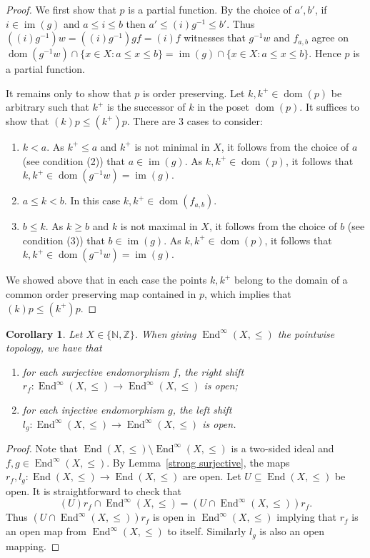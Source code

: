 \documentclass[11pt]{amsart}
\newtheorem{corollary}[theorem]{Corollary}
\theoremstyle{definition}
\newcommand{\N}{\mathbb N}
\newcommand{\Z}{\mathbb Z}
\newcommand{\im}{\operatorname{im}}
\newcommand{\dom}{\operatorname{dom}}
\begin{document}
\begin{proof}
We first show that \(p\) is a partial function. By the choice of \(a',b'\), if \(i\in \im(g)\) and \(a\leq i\leq b\) then \(a'\leq (i)g^{-1}\leq b'\). 
Thus \(((i)g^{-1})w=((i)g^{-1})gf=(i)f\) witnesses that \(g^{-1}w\) and \(f_{a,b}\) agree 
on $\dom(g^{-1}w)\cap \{x\in X: a\leq x\leq b\}=\im(g)\cap \{x\in X: a\leq x\leq b\}$.
Hence \(p\) is a partial function.

It remains only to show that \(p\) is order preserving. Let \(k,k^+\in \dom(p)\) be arbitrary such that \(k^+\) is the successor of \(k \) in the poset \(\dom(p)\). It suffices to show that \((k)p\leq (k^+)p\). There are 3 cases to consider:
\begin{enumerate}[\rm(a)]
    \item \(k<a\). As \(k^+\leq a\) and \(k^+\) is not minimal in \(X\), it follows from the choice of \(a\) (see condition (2)) that \(a\in \im(g)\).
    As \(k,k^+\in \dom(p)\), it follows that \(k,k^+\in \dom(g^{-1}w)=\im(g)\).
    \item \(a\leq k<b\). In this case \(k,k^+\in \dom(f_{a,b})\).
    \item \(b\leq k\). As \(k\geq b\) and \(k\) is not maximal in \(X\), it follows from the choice of \(b\) (see condition (3)) that \(b\in \im(g)\).
    As \(k,k^+\in \dom(p)\), it follows that \(k,k^+\in \dom(g^{-1}w)=\im(g)\).
\end{enumerate}

We showed above that in each case the points \(k,k^+\) belong to the domain of a common order preserving map contained in \(p\), which implies that \((k)p\leq (k^+)p\).
\end{proof}




\begin{corollary}\label{open D1}
Let \(X\in \{\N,\Z\}\). When giving $\operatorname{End}^\infty(X,\leq)$ the pointwise topology, we have that 
\begin{enumerate}
    \item for each surjective endomorphism $f$, the right shift $r_f: \operatorname{End}^\infty(X,\leq)\rightarrow \operatorname{End}^\infty(X,\leq)$ is open;
    \item for each injective endomorphism $g$, the left shift $l_g: \operatorname{End}^\infty(X,\leq)\rightarrow \operatorname{End}^\infty(X,\leq)$ is open.
\end{enumerate}
\end{corollary}
\begin{proof}
Note that $\operatorname{End}(X,\leq)\setminus \operatorname{End}^\infty(X,\leq)$ is a two-sided ideal and \(f,g\in \operatorname{End}^{\infty}(X,\leq)\).
By Lemma~\ref{strong surjective}, the maps \(r_f,l_g:\operatorname{End}(X,\leq)\to \operatorname{End}(X,\leq)\) are open. Let \(U\subseteq \operatorname{End}(X,\leq)\) be open. It is straightforward to check  that
\[(U)r_f\cap \operatorname{End}^{\infty}(X,\leq)=(U\cap \operatorname{End}^{\infty}(X,\leq))r_f.\]
Thus $(U\cap \operatorname{End}^{\infty}(X,\leq))r_f$ is open in \(\operatorname{End}^{\infty}(X,\leq)\) implying that \(r_f\) is an open map from \(\operatorname{End}^{\infty}(X,\leq)\) to itself. Similarly \(l_g\) is also an open mapping.
\end{proof}
\end{document}
